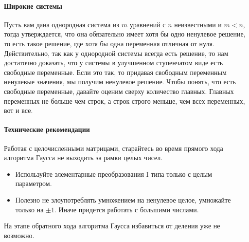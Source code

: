 \paragraph{Широкие системы}

Пусть вам дана однородная система из $m$ уравнений с $n$ неизвестными и $m < n$, тогда утверждается, что она обязательно имеет хотя бы одно ненулевое решение, то есть такое решение, где хотя бы одна переменная отличная от нуля. Действительно, так как у однородной системы всегда есть решение, то нам достаточно доказать, что у системы в улучшенном ступенчатом виде есть свободные переменные. Если это так, то придавая свободным переменным ненулевые значения, мы получим ненулевое решение. Чтобы понять, что есть свободные переменные, давайте оценим сверху количество главных. Главных переменных не больше чем строк, а строк строго меньше, чем всех переменных, вот и все.


\paragraph{Технические рекомендации}

Работая с целочисленными матрицами,  старайтесь во время прямого хода алгоритма Гаусса не выходить за рамки целых чисел.
\begin{itemize}
\item Используйте элементарные преобразования I типа только с целым параметром.

\item Полезно не злоупотреблять умножением на ненулевое целое, умножайте только на $\pm1$.
Иначе придется работать с большими числами.
\end{itemize}
На этапе обратного хода алгоритма Гаусса избавиться от деления уже не возможно.


